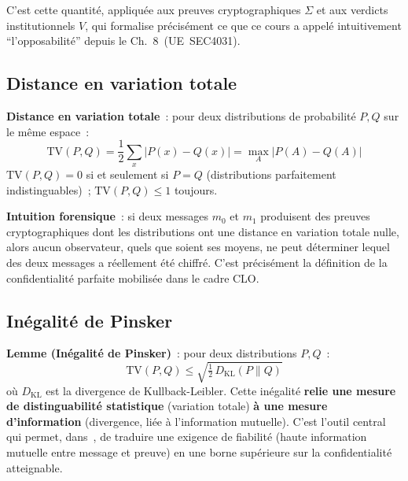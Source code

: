 C'est cette quantité, appliquée aux preuves cryptographiques $\Sigma$
et aux verdicts institutionnels $V$, qui formalise précisément ce
que ce cours a appelé intuitivement ``l'opposabilité'' depuis le
Ch.~8~(UE~SEC4031).

\subsection{Distance en variation totale}

\begin{boxdef}
\textbf{Distance en variation totale}~: pour deux distributions de
probabilité $P, Q$ sur le même espace~:
\begin{equation}
\mathrm{TV}(P,Q) = \frac{1}{2}\sum_{x} |P(x) - Q(x)|
= \max_{A} |P(A) - Q(A)|
\label{eq:tv}
\end{equation}
$\mathrm{TV}(P,Q) = 0$ si et seulement si $P = Q$ (distributions
parfaitement indistinguables)~; $\mathrm{TV}(P,Q) \leq 1$ toujours.
\end{boxdef}

\textbf{Intuition forensique}~: si deux messages $m_0$ et $m_1$
produisent des preuves cryptographiques dont les distributions ont
une distance en variation totale nulle, alors aucun observateur,
quels que soient ses moyens, ne peut déterminer lequel des deux
messages a réellement été chiffré. C'est précisément la définition
de la confidentialité parfaite mobilisée dans le cadre CLO.

\subsection{Inégalité de Pinsker}

\begin{boxjuris}
\textbf{Lemme (Inégalité de Pinsker)}~: pour deux distributions
$P, Q$~:
\begin{equation}
\mathrm{TV}(P,Q) \leq \sqrt{\tfrac{1}{2}\,D_{\mathrm{KL}}(P \| Q)}
\label{eq:pinsker}
\end{equation}
où $D_{\mathrm{KL}}$ est la divergence de Kullback-Leibler.
Cette inégalité \textbf{relie une mesure de distinguabilité
statistique} (variation totale) \textbf{à une mesure
d'information} (divergence, liée à l'information mutuelle).
C'est l'outil central qui permet, dans~\cite{minka2026conditional},
de traduire une exigence de fiabilité (haute information mutuelle
entre message et preuve) en une borne supérieure sur la
confidentialité atteignable.
\end{boxjuris}

